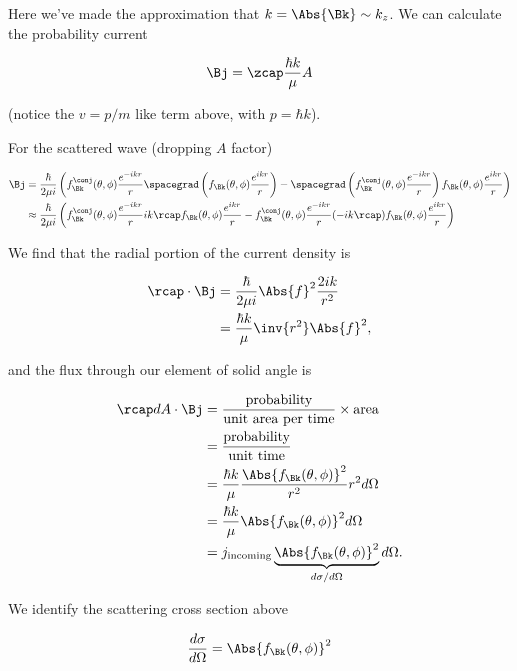 Here we've made the approximation that $k = \Abs{\Bk} \sim k_z$.  We can calculate the probability current

\begin{equation}\label{eqn:qmTwoL24:230}
\Bj = \zcap \frac{\hbar k}{\mu} A
\end{equation}

(notice the $v = p/m$ like term above, with $p = \hbar k$).

For the scattered wave (dropping $A$ factor)

\begin{align*}
\Bj &=
\frac{\hbar}{2 \mu i}
\left(
f_\Bk^\conj(\theta, \phi) \frac{e^{-i k r}}{r} \spacegrad \left(
f_\Bk(\theta, \phi) \frac{e^{i k r}}{r}
\right)
-
\spacegrad \left(
f_\Bk^\conj(\theta, \phi) \frac{e^{-i k r}}{r}
\right)
f_\Bk(\theta, \phi) \frac{e^{i k r}}{r}
\right)
\\
&\approx
\frac{\hbar}{2 \mu i}
\left(
f_\Bk^\conj(\theta, \phi) \frac{e^{-i k r}}{r} i k \rcap f_\Bk(\theta, \phi)
\frac{e^{i k r}}{r}
-
f_\Bk^\conj(\theta, \phi) \frac{e^{-i k r}}{r} (-i k \rcap) f_\Bk(\theta, \phi)
\frac{e^{i k r}}{r}
\right)
\end{align*}

We find that the radial portion of the current density is

\begin{align*}
\rcap \cdot \Bj
&= \frac{\hbar}{2 \mu i} \Abs{f}^2 \frac{ 2 i k }{r^2} \\
&= \frac{\hbar k}{\mu} \inv{r^2} \Abs{f}^2,
\end{align*}

and the flux through our element of solid angle is

\begin{align*}
\rcap dA \cdot \Bj
&=
\frac{\text{probability}}{\text{unit area per time}} \times \text{area}  \\
&= \frac{\text{probability}}{\text{unit time}} \\
&=
\frac{\hbar k}{\mu} \frac{\Abs{f_\Bk(\theta, \phi)}^2}{r^2} r^2 d\Omega \\
&=
\frac{\hbar k }{\mu}
\Abs{f_\Bk(\theta, \phi)}^2 d\Omega \\
&=
j_{\text{incoming}}
\underbrace{\Abs{f_\Bk(\theta, \phi)}^2}_{d\sigma/d\Omega} d\Omega.
\end{align*}

We identify the scattering cross section above

\begin{equation}\label{eqn:qmTwoL24:250}
\frac{d\sigma}{d\Omega}
=
\Abs{f_\Bk(\theta, \phi)}^2
\end{equation}

